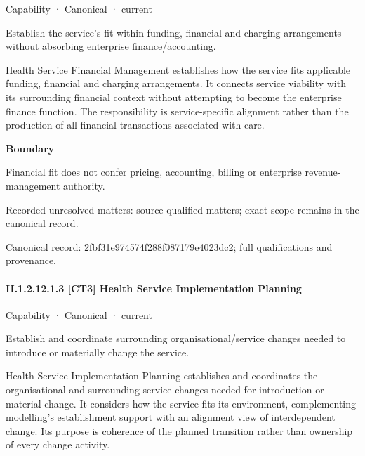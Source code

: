 \label{element:2fbf31e974574f288f087179e4023dc2}
{\small Capability · Canonical · current}\par

Establish the service’s fit within funding, financial and charging arrangements without absorbing enterprise finance/accounting.



Health Service Financial Management establishes how the service fits applicable funding, financial and charging arrangements. It connects service viability with its surrounding financial context without attempting to become the enterprise finance function. The responsibility is service-specific alignment rather than the production of all financial transactions associated with care.



\textbf{Boundary}



Financial fit does not confer pricing, accounting, billing or enterprise revenue-management authority.


{\small Recorded unresolved matters: source-qualified matters; exact scope remains in the canonical record.}\par
{\footnotesize \href{../../../../continuum/strategy/capability/2fbf31e974574f288f087179e4023dc2.md}{Canonical record: 2fbf31e974574f288f087179e4023dc2}; full qualifications and provenance.}\par
\paragraph*{II.1.2.12.1.3 [CT3] Health Service Implementation Planning}
\label{navigation:II.1.2.12.1.3}

\label{element:67bd795d91ce4dd49fdd481a3c451366}
{\small Capability · Canonical · current}\par

Establish and coordinate surrounding organisational/service changes needed to introduce or materially change the service.



Health Service Implementation Planning establishes and coordinates the organisational and surrounding service changes needed for introduction or material change. It considers how the service fits its environment, complementing modelling's establishment support with an alignment view of interdependent change. Its purpose is coherence of the planned transition rather than ownership of every change activity.



